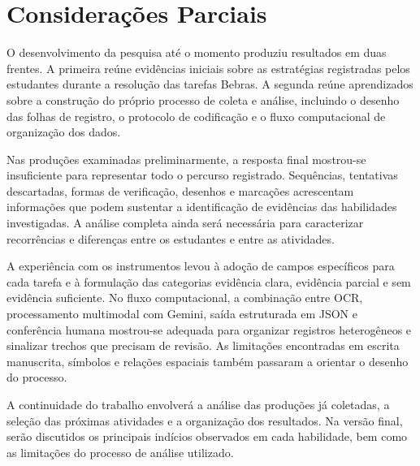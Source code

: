 \section{Considerações Parciais}

O desenvolvimento da pesquisa até o momento produziu resultados em duas frentes. A primeira reúne evidências iniciais sobre as estratégias registradas pelos estudantes durante a resolução das tarefas Bebras. A segunda reúne aprendizados sobre a construção do próprio processo de coleta e análise, incluindo o desenho das folhas de registro, o protocolo de codificação e o fluxo computacional de organização dos dados.

Nas produções examinadas preliminarmente, a resposta final mostrou-se insuficiente para representar todo o percurso registrado. Sequências, tentativas descartadas, formas de verificação, desenhos e marcações acrescentam informações que podem sustentar a identificação de evidências das habilidades investigadas. A análise completa ainda será necessária para caracterizar recorrências e diferenças entre os estudantes e entre as atividades.

A experiência com os instrumentos levou à adoção de campos específicos para cada tarefa e à formulação das categorias evidência clara, evidência parcial e sem evidência suficiente. No fluxo computacional, a combinação entre OCR, processamento multimodal com Gemini, saída estruturada em JSON e conferência humana mostrou-se adequada para organizar registros heterogêneos e sinalizar trechos que precisam de revisão. As limitações encontradas em escrita manuscrita, símbolos e relações espaciais também passaram a orientar o desenho do processo.

A continuidade do trabalho envolverá a análise das produções já coletadas, a seleção das próximas atividades e a organização dos resultados. Na versão final, serão discutidos os principais indícios observados em cada habilidade, bem como as limitações do processo de análise utilizado.



